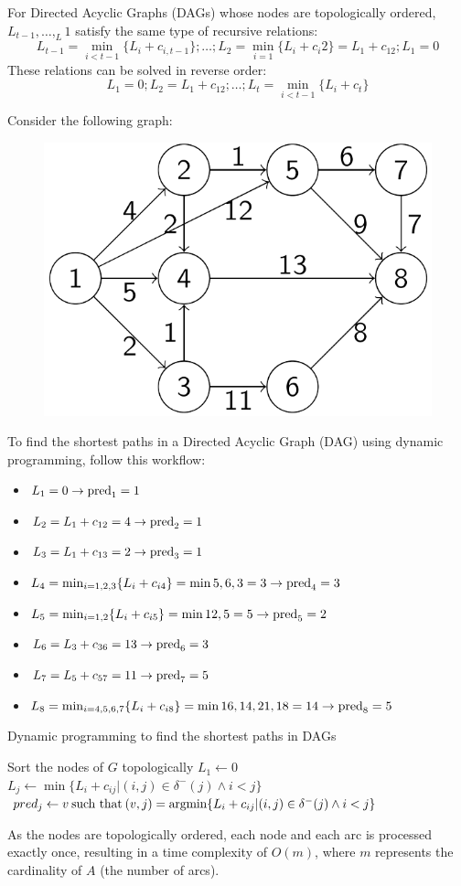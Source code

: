 \documentclass[12pt, a4paper]{report}
\begin{document}
    For Directed Acyclic Graphs (DAGs) whose nodes are topologically ordered, $L_{t-1},\dots,_L1$ satisfy the same type of recursive relations:
    \[L_{t-1}=\min_{i<t-1}\{L_i+c_{i,t-1}\};\dots;L_2=\min_{i=1}\{L_i+c_i2\}=L_1+c_{12};L_1=0\]
    These relations can be solved in reverse order:
    \[L_1=0;L_2=L_1+c_{12};\dots;L_{t}=\min_{i<t-1}\{L_i+c_{t}\}\]
    \begin{example}
        Consider the following graph:
        \begin{figure}[H]
            \centering
            \includegraphics[width=0.4\linewidth]{images/DAG.png}
        \end{figure}
        To find the shortest paths in a Directed Acyclic Graph (DAG) using dynamic programming, follow this workflow:
        \begin{itemize}
            \item $L_1=0 \rightarrow \textnormal{pred}_1=1$
            \item $L_2=L_1+c_{12}=4 \rightarrow \textnormal{pred}_2=1$
            \item $L_3=L_1+c_{13}=2 \rightarrow \textnormal{pred}_3=1$
            \item $L_4=\min_{i=1,2,3}\{L_i+c_{i4}\}=\min{5,6,3}=3 \rightarrow \textnormal{pred}_4=3$
            \item $L_5=\min_{i=1,2}\{L_i+c_{i5}\}=\min{12,5}=5 \rightarrow \textnormal{pred}_5=2$
            \item $L_6=L_3+c_{36}=13 \rightarrow \textnormal{pred}_6=3$
            \item $L_7=L_5+c_{57}=11 \rightarrow \textnormal{pred}_7=5$
            \item $L_8=\min_{i=4,5,6,7}\{L_i+c_{i8}\}=\min{16,14,21,18}=14 \rightarrow \textnormal{pred}_8=5$
        \end{itemize}
    \end{example}
    \begin{algorithm}[H]
        \caption{Dynamic programming to find the shortest paths in DAGs}
            \begin{algorithmic}[1]
                \State Sort the nodes of $G$ topologically
                \State $L_1 \leftarrow 0$
                    \State $L_j \leftarrow \min\{L_i+c_{ij}|(i,j) \in \delta^{-}(j) \land i < j\}$
                    \State $pred_j \leftarrow v \: \textnormal{such that} \: (v,j)=\textnormal{argmin} \{L_i+c_{ij}|(i,j) \in \delta^{-}(j) \land i < j\}$
                \EndFor
            \end{algorithmic}
    \end{algorithm}
    As the nodes are topologically ordered, each node and each arc is processed exactly once, resulting in a time complexity of $O(m)$, where $m$ represents the cardinality of $A$ (the number of arcs).    
    
\end{document}
